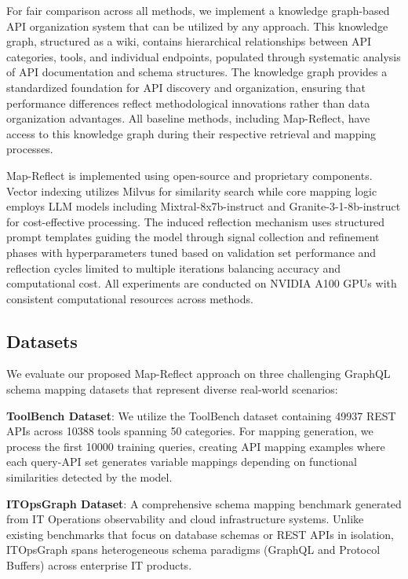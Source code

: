 \documentclass[sigconf, nonacm]{acmart}
\begin{document}
For fair comparison across all methods, we implement a knowledge graph-based API organization system that can be utilized by any approach. This knowledge graph, structured as a wiki, contains hierarchical relationships between API categories, tools, and individual endpoints, populated through systematic analysis of API documentation and schema structures. The knowledge graph provides a standardized foundation for API discovery and organization, ensuring that performance differences reflect methodological innovations rather than data organization advantages. All baseline methods, including Map-Reflect, have access to this knowledge graph during their respective retrieval and mapping processes.

Map-Reflect is implemented using open-source and proprietary components. Vector indexing utilizes Milvus for similarity search while core mapping logic employs LLM models including Mixtral-8x7b-instruct and Granite-3-1-8b-instruct for cost-effective processing. The induced reflection mechanism uses structured prompt templates guiding the model through signal collection and refinement phases with hyperparameters tuned based on validation set performance and reflection cycles limited to multiple iterations balancing accuracy and computational cost. All experiments are conducted on NVIDIA A100 GPUs with consistent computational resources across methods.

\subsection{Datasets}

We evaluate our proposed Map-Reflect approach on three challenging GraphQL schema mapping datasets that represent diverse real-world scenarios:

\textbf{ToolBench Dataset}: We utilize the ToolBench dataset containing 49937 REST APIs across 10388 tools spanning 50 categories. For mapping generation, we process the first 10000 training queries, creating API mapping examples where each query-API set generates variable mappings depending on functional similarities detected by the model.

\textbf{ITOpsGraph Dataset}: A comprehensive schema mapping benchmark generated from IT Operations observability and cloud infrastructure systems. Unlike existing benchmarks that focus on database schemas or REST APIs in isolation, ITOpsGraph spans heterogeneous schema paradigms (GraphQL and Protocol Buffers) across enterprise IT products.
\end{document}

